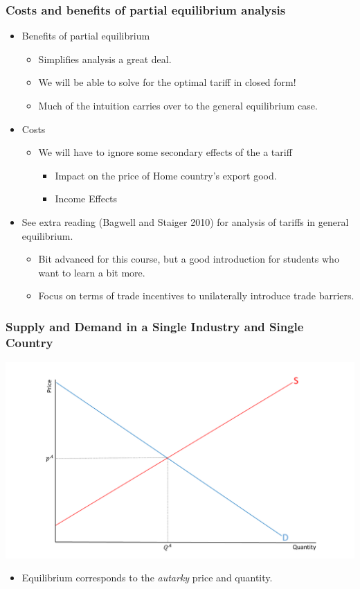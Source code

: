\documentclass{beamer}
\begin{document}
\begin{frame}
	\frametitle{Costs and benefits of partial equilibrium analysis}

\begin{itemize}
		\item Benefits of partial equilibrium 
		\begin{itemize}
			\item Simplifies analysis a great deal.
			\item We will be able to solve for the optimal tariff in closed form!
			\item Much of the intuition carries over to the general equilibrium case.
		\end{itemize}
		\item Costs
		\begin{itemize}
			\item We will have to ignore some secondary effects of the a tariff
				\begin{itemize}
					\item Impact on the price of Home country's export good.
					\item Income Effects
				\end{itemize}
		\end{itemize}
	\item See extra reading (Bagwell and Staiger 2010) for analysis of tariffs in general equilibrium.
		\begin{itemize}
			\item Bit advanced for this course, but a good introduction for students who want to learn a bit more.
			\item Focus on terms of trade incentives to unilaterally introduce trade barriers.
		\end{itemize}
\end{itemize}
\end{frame}

\begin{frame}
	\frametitle{Supply and Demand in a Single Industry and Single Country}
	\includegraphics[scale=0.30]{SL_1.pdf} 
	\begin{itemize}
		\item Equilibrium corresponds to the \emph{autarky} price and quantity.
	\end{itemize}
\end{frame}
\end{document}
